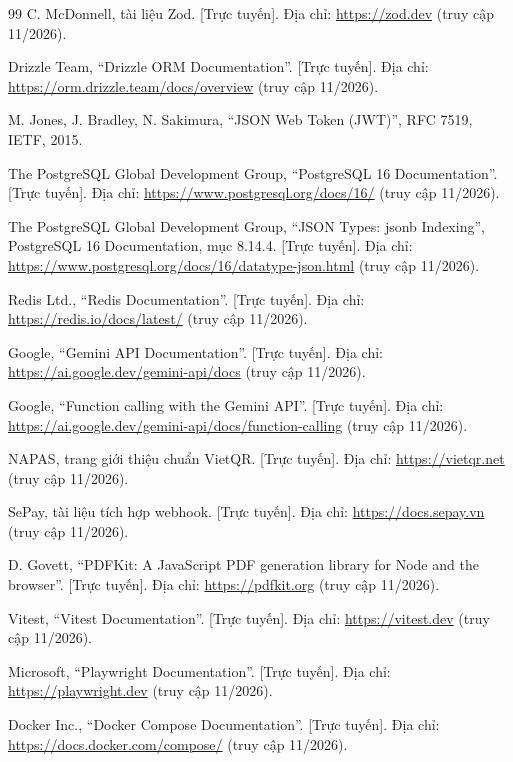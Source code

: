 \begin{thebibliography}{99}
 C. McDonnell, tài liệu Zod. [Trực tuyến]. Địa chỉ: \url{https://zod.dev} (truy cập 11/2026).

 Drizzle Team, ``Drizzle ORM Documentation''. [Trực tuyến]. Địa chỉ: \url{https://orm.drizzle.team/docs/overview} (truy cập 11/2026).

 M. Jones, J. Bradley, N. Sakimura, ``JSON Web Token (JWT)'', RFC 7519, IETF, 2015.

 The PostgreSQL Global Development Group, ``PostgreSQL 16 Documentation''. [Trực tuyến]. Địa chỉ: \url{https://www.postgresql.org/docs/16/} (truy cập 11/2026).

 The PostgreSQL Global Development Group, ``JSON Types: jsonb Indexing'', PostgreSQL 16 Documentation, mục 8.14.4. [Trực tuyến]. Địa chỉ: \url{https://www.postgresql.org/docs/16/datatype-json.html} (truy cập 11/2026).

 Redis Ltd., ``Redis Documentation''. [Trực tuyến]. Địa chỉ: \url{https://redis.io/docs/latest/} (truy cập 11/2026).

 Google, ``Gemini API Documentation''. [Trực tuyến]. Địa chỉ: \url{https://ai.google.dev/gemini-api/docs} (truy cập 11/2026).

 Google, ``Function calling with the Gemini API''. [Trực tuyến]. Địa chỉ: \url{https://ai.google.dev/gemini-api/docs/function-calling} (truy cập 11/2026).

 NAPAS, trang giới thiệu chuẩn VietQR. [Trực tuyến]. Địa chỉ: \url{https://vietqr.net} (truy cập 11/2026).

 SePay, tài liệu tích hợp webhook. [Trực tuyến]. Địa chỉ: \url{https://docs.sepay.vn} (truy cập 11/2026).

 D. Govett, ``PDFKit: A JavaScript PDF generation library for Node and the browser''. [Trực tuyến]. Địa chỉ: \url{https://pdfkit.org} (truy cập 11/2026).

 Vitest, ``Vitest Documentation''. [Trực tuyến]. Địa chỉ: \url{https://vitest.dev} (truy cập 11/2026).

 Microsoft, ``Playwright Documentation''. [Trực tuyến]. Địa chỉ: \url{https://playwright.dev} (truy cập 11/2026).

 Docker Inc., ``Docker Compose Documentation''. [Trực tuyến]. Địa chỉ: \url{https://docs.docker.com/compose/} (truy cập 11/2026).


\end{thebibliography}
